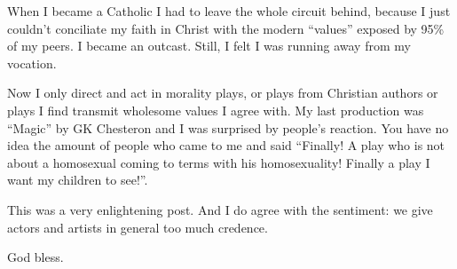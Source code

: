 \begin{footnotesize}
\begin{sffamily}
When I became a Catholic I had to leave the whole circuit behind, because I just couldn't conciliate my faith in Christ with the modern ``values'' exposed by 95\% of my peers. I became an outcast. Still, I felt I was running away from my vocation.

Now I only direct and act in morality plays, or plays from Christian authors or plays I find transmit wholesome values I agree with. My last production was ``Magic'' by GK Chesteron and I was surprised by people's reaction. You have no idea the amount of people who came to me and said ``Finally! A play who is not about a homosexual coming to terms with his homosexuality! Finally a play I want my children to see!''.

This was a very enlightening post. And I do agree with the sentiment: we give actors and artists in general too much credence.

God bless.

\end{sffamily}
\end{footnotesize}

